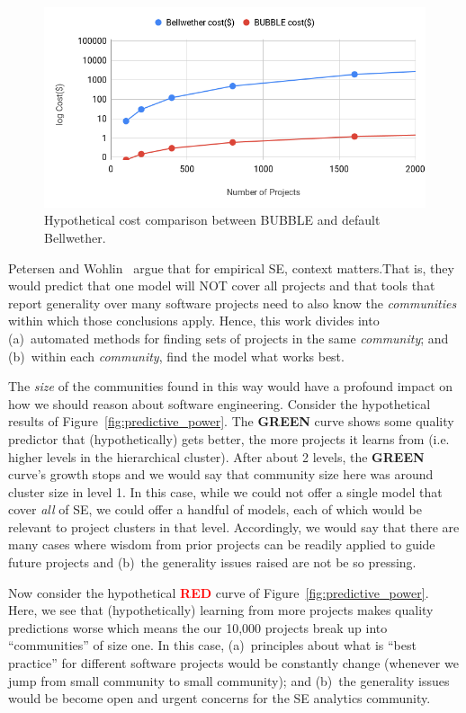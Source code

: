 \documentclass[10pt,journal,compsoc]{IEEEtran}
\begin{document}
\begin{figure}[!ht]
    \centering
    \includegraphics[width=\linewidth]{figs/cost.png}
    \caption{Hypothetical cost comparison between BUBBLE and default Bellwether.}
    \label{fig:cost}
\end{figure}

Petersen and Wohlin~\cite{Petersen2009} argue that for empirical SE, context matters.That is, they would predict that one model  will NOT  cover all  projects and that tools that report  generality  over many software projects need to also know the {\em communities} within which those conclusions   apply. Hence, this work divides into (a)~automated methods for finding sets of projects in the same {\em community}; and (b)~within each {\em community}, find the model what works best. 

The {\em size} of the communities found in this way would have a profound impact on how we should reason about software engineering. Consider the hypothetical results of Figure~\ref{fig:predictive_power}. The \textcolor{ao(english)}{{\bf GREEN}} curve shows some quality predictor that (hypothetically) gets better, the more projects it learns from (i.e. higher levels in the hierarchical cluster). After about 2 levels, the \textcolor{ao(english)}{{\bf GREEN}} curve's growth stops and we would say that community size here was around cluster size in level 1. In this case, while we could not offer a single model that cover {\em all} of SE, we could offer a handful of models, each of which would be relevant to project clusters in that level. Accordingly, we would say that there are many cases where  wisdom from prior projects can be readily applied to guide future projects and (b)~the generality issues raised are not be so pressing.

Now consider the hypothetical \textcolor{red}{{\bf RED}} curve of Figure~\ref{fig:predictive_power}. Here, we see that (hypothetically)  learning from more projects makes quality predictions worse which means the our 10,000 projects break up into ``communities'' of size one. In this case,  (a)~principles about what is ``best practice'' for different software projects would be constantly change (whenever we jump from small community to small community); and (b)~the generality issues would be become open and urgent concerns for the SE analytics community.
\end{document}

